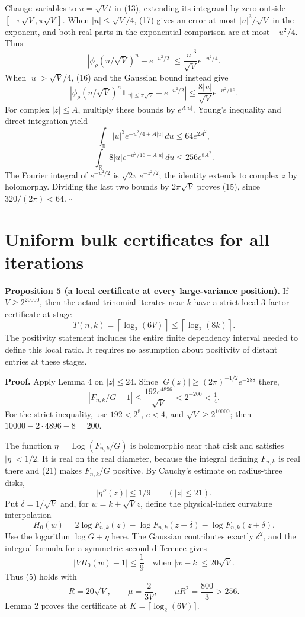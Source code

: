\documentclass[11pt,a4paper]{article}
\begin{document}
Change variables to \(u=\sqrt Vt\) in (13), extending its integrand by
zero outside \([-\pi\sqrt V,\pi\sqrt V]\). When \(|u|\leq\sqrt V/4\),
(17) gives an error at most \(|u|^3/\sqrt V\) in the exponent, and both
real parts in the exponential comparison are at most \(-u^2/4\). Thus \[
 |\phi_\rho(u/\sqrt V)^n-e^{-u^2/2}|
 \leq\frac{|u|^3}{\sqrt V}e^{-u^2/4}. \tag{18}
\] When \(|u|>\sqrt V/4\), (16) and the Gaussian bound instead give \[
 |\phi_\rho(u/\sqrt V)^n\mathbf1_{|u|\leq\pi\sqrt V}-e^{-u^2/2}|
 \leq\frac{8|u|}{\sqrt V}e^{-u^2/16}. \tag{19}
\] For complex \(|z|\leq A\), multiply these bounds by \(e^{A|u|}\).
Young's inequality and direct integration yield \[
 \int_{\mathbb R}|u|^3e^{-u^2/4+A|u|}\,du\leq64e^{2A^2},
\] \[
 \int_{\mathbb R}8|u|e^{-u^2/16+A|u|}\,du\leq256e^{8A^2}.
\] The Fourier integral of \(e^{-u^2/2}\) is \(\sqrt{2\pi}e^{-z^2/2}\);
the identity extends to complex \(z\) by holomorphy. Dividing the last
two bounds by \(2\pi\sqrt V\) proves (15), since \(320/(2\pi)<64\).
\(\square\)

\section{Uniform bulk certificates for all iterations}\label{uniform-bulk-certificates-for-all-iterations}


\textbf{Proposition 5 (a local certificate at every large-variance
position).} If \(V\geq2^{20000}\), then the actual trinomial iterates
near \(k\) have a strict local 3-factor certificate at stage \[
 T(n,k)=\left\lceil\log_2(6V)\right\rceil
 \leq\left\lceil\log_2(8k)\right\rceil. \tag{20}
\] The positivity statement includes the entire finite dependency
interval needed to define this local ratio. It requires no assumption
about positivity of distant entries at these stages.

\textbf{Proof.} Apply Lemma 4 on \(|z|\leq24\). Since
\(|G(z)|\geq(2\pi)^{-1/2}e^{-288}\) there, \[
 |F_{n,k}/G-1|
 \leq\frac{192e^{4896}}{\sqrt V}<2^{-200}<\tfrac14. \tag{21}
\] For the strict inequality, use \(192<2^8\), \(e<4\), and
\(\sqrt V\geq2^{10000}\); then \(10000-2\cdot4896-8=200\).

The function \(\eta=\operatorname{Log}(F_{n,k}/G)\) is holomorphic near
that disk and satisfies \(|\eta|<1/2\). It is real on the real diameter,
because the integral defining \(F_{n,k}\) is real there and (21) makes
\(F_{n,k}/G\) positive. By Cauchy's estimate on radius-three disks, \[
 |\eta''(z)|\leq1/9\qquad(|z|\leq21).
\] Put \(\delta=1/\sqrt V\) and, for \(w=k+\sqrt Vz\), define the
physical-index curvature interpolation \[
 H_0(w)=2\log F_{n,k}(z)-\log F_{n,k}(z-\delta)
                       -\log F_{n,k}(z+\delta).
\] Use the logarithm \(\log G+\eta\) here. The Gaussian contributes
exactly \(\delta^2\), and the integral formula for a symmetric second
difference gives \[
 |VH_0(w)-1|\leq\frac19
 \quad\text{when }|w-k|\leq20\sqrt V. \tag{22}
\] Thus (5) holds with \[
 R=20\sqrt V,\qquad \mu=\frac2{3V},\qquad
 \mu R^2=\frac{800}{3}>256.
\] Lemma 2 proves the certificate at \(K=\lceil\log_2(6V)\rceil\).
\end{document}
